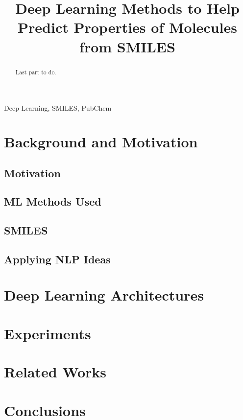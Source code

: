 \documentclass[conference]{IEEEtran}
\begin{document}
\title{Deep Learning Methods to Help Predict Properties of Molecules from SMILES}

\maketitle

\begin{abstract}
Last part to do.
\end{abstract}

\begin{IEEEkeywords}
Deep Learning, SMILES, PubChem
\end{IEEEkeywords}






\section{Background and Motivation \label{background}}
\subsection{Motivation}
\subsection{ML Methods Used}
\subsection{SMILES}
\subsection{Applying NLP Ideas}

\section{Deep Learning Architectures \label{archi}}

\section{Experiments \label{experiments}}

\section{Related Works \label{relwork}}
\section{Conclusions \label{conclude}}
\end{document}
